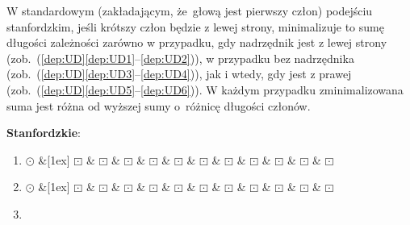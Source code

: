 \documentclass[licencjacka]{pracamgr_Kogni}
\begin{document}
    W standardowym (zakładającym, że~głową jest pierwszy człon) podejściu stanfordzkim, jeśli krótszy człon będzie z lewej strony, minimalizuje to sumę długości zależności zarówno w przypadku, gdy nadrzędnik jest z lewej strony (zob.~(\ref{dep:UD}\ref{dep:UD1}--\ref{dep:UD2})), w przypadku bez nadrzędnika (zob.~(\ref{dep:UD}\ref{dep:UD3}--\ref{dep:UD4})), jak i wtedy, gdy jest z prawej (zob.~(\ref{dep:UD}\ref{dep:UD5}--\ref{dep:UD6})).
    W każdym przypadku zminimalizowana suma jest różna od wyższej sumy o~różnicę długości członów.
    \newpage
    \begin{exe}
        \ex\label{dep:UD} \textbf{Stanfordzkie}:
        \begin{enumerate}[label=\alph{enumi}. , ref=\alph{enumi}]
            \item 
            \begin{dependency}[baseline=-3pt, hide label, edge height=.5em]
              \begin{deptext}[column sep=.1ex]
                $\odot$  \&[1ex] $\boxdot$ \& $\boxdot$ \& $\boxdot$ \& $\boxdot$ \& $\boxdot$ \& $\boxdot$ \& $\boxdot$ \& $\boxdot$ \& $\boxdot$ \& $\boxdot$ \& $\boxdot$\\
              \end{deptext}
            \end{dependency}
            \label{dep:UD1}
          \item 
            \begin{dependency}[baseline=-3pt, hide label, edge height=.5em]
              \begin{deptext}[column sep=.1ex]
                $\odot$  \&[1ex] $\boxdot$ \& $\boxdot$ \& $\boxdot$ \& $\boxdot$ \& $\boxdot$ \& $\boxdot$ \& $\boxdot$ \& $\boxdot$ \& $\boxdot$ \& $\boxdot$ \& $\boxdot$\\
              \end{deptext}
            \end{dependency}
            \label{dep:UD2}
          \item 
            \begin{dependency}[baseline=-3pt, hide label, edge height=.5em]
              \begin{deptext}[column sep=.1ex]

\end{deptext}
\end{dependency}
\end{enumerate}
\end{exe}
\end{document}
